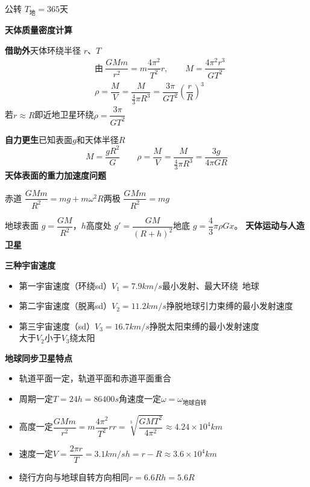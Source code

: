 公转 $T_{\text{地}}=365$天

\textbf{天体质量密度计算}

\textbf{借助外}\quad 天体环绕半径 $r$、$T$
\begin{align*}
& \text{由}\ \dfrac{GMm}{r^2}=m\dfrac{4\pi^2}{T^2}r, \qquad M=\dfrac{4\pi^2r^3}{GT^2}\\
& \rho=\dfrac{M}{V}=\dfrac{M}{\frac{4}{3}\pi R^3}=\dfrac{3\pi}{GT^2}\left(\dfrac{r}{R}\right)^3
\end{align*}
若$r\approx R$即近地卫星环绕\quad $\rho=\dfrac{3\pi}{GT^2}$

\textbf{自力更生}\quad 已知表面$g$和天体半径$R$
\[ M=\dfrac{gR^2}{G}\qquad \rho=\dfrac{M}{V}=\dfrac{M}{\frac{4}{3}\pi R^3}=\dfrac{3g}{4\pi GR} \]
\textbf{天体表面的重力加速度问题}

赤道 $\dfrac{GMm}{R^2}=mg+m\omega^2R$\quad 两极\,\unclear{$\therefore$}\,$\dfrac{GMm}{R^2}=mg$

地球表面 $g=\dfrac{GM}{R^2}$，$h$高度处 $g'=\dfrac{GM}{(R+h)^2}$\quad 地底 $g=\dfrac{4}{3}\pi\rho Gx$。
\textbf{天体运动与人造卫星}

\textbf{三种宇宙速度}
\begin{itemize}
  \item 第一宇宙速度（环绕sd）\quad $V_1=7.9\unit{km/s}$\quad 最小发射、最大环绕\ 地球
  \item 第二宇宙速度（脱离sd）\quad $V_2=11.2\unit{km/s}$\quad 挣脱地球引力束缚的最小发射速度
  \item 第三宇宙速度（sd）\quad $V_3=16.7\unit{km/s}$\quad 挣脱太阳束缚的最小发射速度\\ 大于$V_2$小于$V_3$绕太阳
\end{itemize}

\textbf{地球同步卫星特点}
\begin{itemize}
  \item 轨道平面一定，轨道平面和赤道平面重合
  \item 周期一定\quad $T=24\unit{h}=86400\unit{s}$\quad 角速度一定\quad $\omega=\omega_{\text{地球自转}}$
  \item 高度一定\quad $\dfrac{GMm}{r^2}=m\dfrac{4\pi^2}{T^2}r$\quad $r=\sqrt[3]{\dfrac{GMT^2}{4\pi^2}}\approx4.24\times10^4\unit{km}$
  \item 速度一定\quad $V=\dfrac{2\pi r}{T}=3.1\unit{km/s}$\quad $h=r-R\approx3.6\times10^4\unit{km}$
  \item 绕行方向与地球自转方向相同\quad $r=6.6R$\quad $h=5.6R$
\end{itemize}

